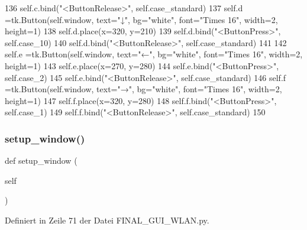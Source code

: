 \begin{DoxyCode}
136         self.c.bind(\textcolor{stringliteral}{"<ButtonRelease>"}, self.case\_standard)
137         self.d =tk.Button(self.window, text=\textcolor{stringliteral}{"↓"}, bg=\textcolor{stringliteral}{"white"}, font=\textcolor{stringliteral}{"Times 16"}, width=2, height=1)
138         self.d.place(x=320, y=210)
139         self.d.bind(\textcolor{stringliteral}{"<ButtonPress>"}, self.case\_10)
140         self.d.bind(\textcolor{stringliteral}{"<ButtonRelease>"}, self.case\_standard)
141 
142         self.e =tk.Button(self.window, text=\textcolor{stringliteral}{"←"}, bg=\textcolor{stringliteral}{"white"}, font=\textcolor{stringliteral}{"Times 16"}, width=2, height=1)
143         self.e.place(x=270, y=280) 
144         self.e.bind(\textcolor{stringliteral}{"<ButtonPress>"}, self.case\_2)
145         self.e.bind(\textcolor{stringliteral}{"<ButtonRelease>"}, self.case\_standard)
146         self.f =tk.Button(self.window, text=\textcolor{stringliteral}{"→"}, bg=\textcolor{stringliteral}{"white"}, font=\textcolor{stringliteral}{"Times 16"}, width=2, height=1)
147         self.f.place(x=320, y=280)
148         self.f.bind(\textcolor{stringliteral}{"<ButtonPress>"}, self.case\_1)
149         self.f.bind(\textcolor{stringliteral}{"<ButtonRelease>"}, self.case\_standard)     
150   
\end{DoxyCode}
\mbox{\label{class_f_i_n_a_l___g_u_i___w_l_a_n_1_1_w_l_a_n_a9fe79fb8dbee1e660dc971b137c55f3f}} 
\subsubsection{\texorpdfstring{setup\+\_\+window()}{setup\_window()}}
{\footnotesize\ttfamily def setup\+\_\+window (\begin{DoxyParamCaption}\item[{}]{self }\end{DoxyParamCaption})}



Definiert in Zeile 71 der Datei F\+I\+N\+A\+L\+\_\+\+G\+U\+I\+\_\+\+W\+L\+A\+N.\+py.


